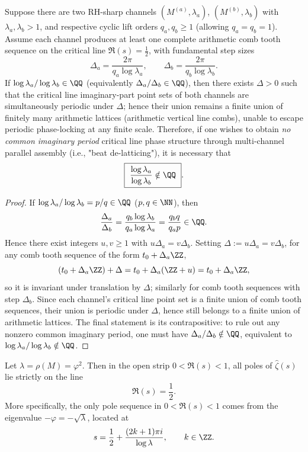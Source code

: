\begin{proposition}\label{prop:finite-rh-beat-irrational-log}
Suppose there are two RH-sharp channels \((M^{(a)},\lambda_a)\), \((M^{(b)},\lambda_b)\) with \(\lambda_a,\lambda_b>1\), and respective cyclic lift orders \(q_a,q_b\ge 1\) (allowing \(q_a=q_b=1\)).
Assume each channel produces at least one complete arithmetic comb tooth sequence on the critical line \(\Re(s)=\tfrac12\), with fundamental step sizes
\[
\Delta_a=\frac{2\pi}{q_a\log\lambda_a},\qquad
\Delta_b=\frac{2\pi}{q_b\log\lambda_b}.
\]
If \(\log\lambda_a/\log\lambda_b\in\QQ\) (equivalently \(\Delta_a/\Delta_b\in\QQ\)), then there exists \(\Delta>0\) such that the critical line imaginary-part point sets of both channels are simultaneously periodic under \(\Delta\); hence their union remains a finite union of finitely many arithmetic lattices (arithmetic vertical line combs), unable to escape periodic phase-locking at any finite scale.
Therefore, if one wishes to obtain \emph{no common imaginary period} critical line phase structure through multi-channel parallel assembly (i.e., "beat de-latticing"), it is necessary that
\[
\boxed{\ \frac{\log\lambda_a}{\log\lambda_b}\notin\QQ\ }.
\]
\end{proposition}
\begin{proof}
If \(\log\lambda_a/\log\lambda_b=p/q\in\QQ\) (\(p,q\in\NN\)), then
\[
\frac{\Delta_a}{\Delta_b}
=\frac{q_b\log\lambda_b}{q_a\log\lambda_a}
=\frac{q_b q}{q_a p}\in\QQ.
\]
Hence there exist integers \(u,v\ge 1\) with \(u\Delta_a=v\Delta_b\). Setting \(\Delta:=u\Delta_a=v\Delta_b\), for any comb tooth sequence of the form \(t_0+\Delta_a\ZZ\),
\[
(t_0+\Delta_a\ZZ)+\Delta=t_0+\Delta_a(\ZZ+u)=t_0+\Delta_a\ZZ,
\]
so it is invariant under translation by \(\Delta\); similarly for comb tooth sequences with step \(\Delta_b\).
Since each channel's critical line point set is a finite union of comb tooth sequences, their union is periodic under \(\Delta\), hence still belongs to a finite union of arithmetic lattices.
The final statement is its contrapositive: to rule out any nonzero common imaginary period, one must have \(\Delta_a/\Delta_b\notin\QQ\), equivalent to \(\log\lambda_a/\log\lambda_b\notin\QQ\).
\end{proof}

\begin{proposition}[All nontrivial poles in the critical strip lie on \texorpdfstring{$\Re(s)=\tfrac12$}{Re(s)=1/2}]\label{prop:finite-rh-40}
Let $\lambda=\rho(M)=\varphi^2$. Then in the open strip $0<\Re(s)<1$, all poles of $\widehat{\zeta}(s)$ lie strictly on the line
\[
\Re(s)=\frac12.
\]
More specifically, the only pole sequence in $0<\Re(s)<1$ comes from the eigenvalue $-\varphi=-\sqrt{\lambda}$, located at
\[
s=\frac12+\frac{(2k+1)\pi i}{\log\lambda},\qquad k\in\ZZ.
\]
\end{proposition}

